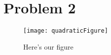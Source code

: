 \documentclass[../../main.tex]{subfiles}
\begin{document}
\graphicspath{{images/}{./problems/Problem2/images/}}

\section{Problem 2}

\begin{figure}[htp]
	\centering
	\texttt{[image: quadraticFigure]} %
	\caption{Here's our figure}
\end{figure}
\end{document}
